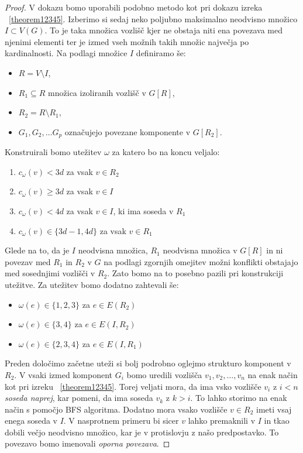 \documentclass[12pt,a4paper,twoside]{article}
\theoremstyle{definition} %
\theoremstyle{plain} %
\numberwithin{equation}{section}  %
\begin{document}
\begin{proof}
V dokazu bomo uporabili podobno metodo kot pri dokazu izreka ~\ref{theorem12345}. Izberimo si sedaj neko poljubno maksimalno neodvisno množico  $ I \subset V(G)$. To je taka množica vozlišč kjer ne obstaja niti ena povezava med njenimi elementi ter je izmed vseh možnih takih množic največja po kardinalnosti. Na podlagi množice $I$ definiramo še:
\begin{itemize}
\item $R = V \setminus I$,
\item $R_1 \subseteq R$ množica izoliranih vozlišč v $G[R]$,
\item $R_2 = R \setminus R_1$,
\item $G_1, G_2, \ldots G_p$ označujejo povezane komponente v $G[R_2]$.
\end{itemize}
Konstruirali bomo utežitev $\omega$ za katero bo na koncu veljalo:
\begin{enumerate}
\item $c_{\omega}(v) < 3d $ za vsak $v \in R_2$
\item $c_{\omega}(v) \ge 3d $ za vsak $v \in I$
\item $c_{\omega}(v) < 4d $ za vsak $v \in I$, ki ima soseda v $R_1$
\item $c_{\omega}(v) \in \{3d - 1, 4d\} $ za vsak $v \in R_1$
\end{enumerate}
Glede na to, da je $I$ neodvisna množica, $R_1$ neodvisna množica v $G[R]$ in ni povezav med $R_1$ in $R_2$ v $G$ na podlagi zgornjih omejitev možni konflikti obstajajo med sosednjimi vozlišči v $R_2$. Zato bomo na to posebno pazili pri konstrukciji utežitve. Za utežitev bomo dodatno zahtevali še:
\begin{itemize}
\item $\omega(e) \in \{1,2,3\}$ za $e \in E(R_2)$
\item $\omega(e) \in \{3,4\}$ za $e \in E(I, R_2)$
\item $\omega(e) \in \{2,3,4\}$ za $e \in E(I, R_1)$
\end{itemize}
Preden določimo začetne uteži si bolj podrobno oglejmo strukturo komponent v $R_2$. V vsaki izmed komponent $G_i$ bomo uredili vozlišča  $v_1, v_2, \ldots, v_n$ na enak način kot pri izreku ~\ref{theorem12345}. Torej veljati mora, da ima vsko vozlišče $v_i$ z $i < n$ \textit{soseda naprej}, kar pomeni, da ima soseda $v_k$ z $ k > i$. To lahko storimo na enak način s pomočjo BFS algoritma. Dodatno mora vsako vozlišče $v \in R_2$ imeti vsaj enega soseda v $I$. V nasprotnem primeru bi sicer $v$ lahko premaknili v $I$ in tkao dobili večjo neodvisno množico, kar je v protislovju z našo predpostavko. To povezavo bomo imenovali \textit{oporna povezava}.


\end{proof}
\end{document}

